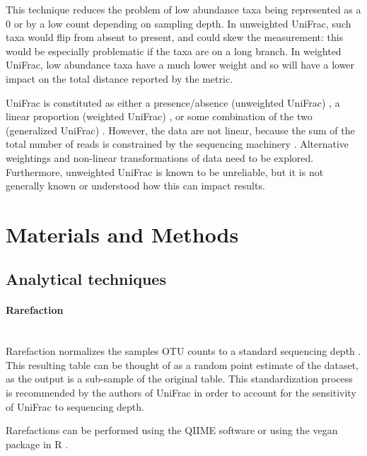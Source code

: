 \documentclass[10pt,letterpaper]{article}
\begin{document}
This technique reduces the problem of low abundance taxa being represented as a 0 or by a low count depending on sampling depth. In unweighted UniFrac, such taxa would flip from absent to present, and could skew the measurement: this would be especially problematic if the taxa are on a long branch. In weighted UniFrac, low abundance taxa have a much lower weight and so will have a lower impact on the total distance reported by the metric.

UniFrac is constituted as either a presence/absence (unweighted UniFrac) \cite{lozupone2005unifrac}, a linear proportion (weighted UniFrac) \cite{lozupone2007quantitative}, or some combination of the two (generalized UniFrac) \cite{chen2012associating}. However, the data are not linear, because the sum of the total number of reads is constrained by the sequencing machinery \cite{friedman2012inferring} \cite{fernandes2013anova} \cite{fernandes2014unifying} \cite{lovell2015proportionality}. Alternative weightings and non-linear transformations of data need to be explored. Furthermore, unweighted UniFrac is known to be unreliable, but it is not generally known or understood how this can impact results.

\section*{Materials and Methods}

\subsection{Analytical techniques}

\paragraph{Rarefaction}\mbox{}\\
Rarefaction normalizes the samples OTU counts to a standard sequencing depth \cite{simberloff1978use}. This resulting table can be thought of as a random point estimate of the dataset, as the output is a sub-sample of the original table. This standardization process is recommended by the authors of UniFrac \cite{de2011evaluation} in order to account for the sensitivity of UniFrac to sequencing depth.

Rarefactions can be performed using the QIIME software \cite{caporaso2010qiime} or using the vegan package in R \cite{oksanen2007vegan}.
\end{document}
